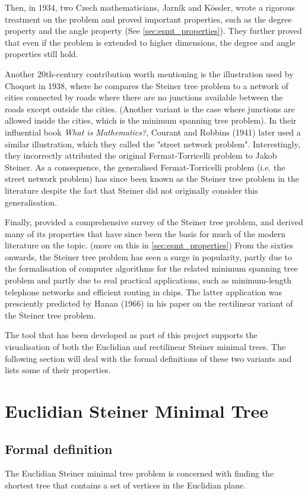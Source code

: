 \documentclass{l4proj}
\begin{document}
Then, in 1934, two Czech mathematicians, Jarník and Kössler, wrote a rigorous treatment on the problem and proved important properties, such as the degree property and the angle property (See \ref{sec:esmt_properties}). They further proved that even if the problem is extended to higher dimensions, the degree and angle properties still hold.

Another 20th-century contribution worth mentioning is the illustration used by Choquet in 1938, where he compares the Steiner tree problem to a network of cities connected by roads where there are no junctions available between the roads except outside the cities. (Another variant is the case where junctions are allowed inside the cities, which is the minimum spanning tree problem). In their influential book \textit{What is Mathematics?}, Courant and Robbins (1941) later used a similar illustration, which they called the "street network problem". Interestingly, they incorrectly attributed the original Fermat-Torricelli problem to Jakob Steiner. As a consequence, the generalised Fermat-Torricelli problem (i.e. the street network problem) has since been known as the Steiner tree problem in the literature despite the fact that Steiner did not originally consider this generalisation.

Finally, \cite{Gilbert1968SteinerMT} provided a comprehensive survey of the Steiner tree problem, and derived many of its properties that have since been the basis for much of the modern literature on the topic. (more on this in \ref{sec:esmt_properties}) From the sixties onwards, the Steiner tree problem has seen a surge in popularity, partly due to the formalisation of computer algorithms for the related minimum spanning tree problem and partly due to real practical applications, such as minimum-length telephone networks and efficient routing in chips. The latter application was presciently predicted by Hanan (1966) in his paper on the rectilinear variant of the Steiner tree problem.

The tool that has been developed as part of this project supports the visualisation of both the Euclidian and rectilinear Steiner minimal trees. The following section will deal with the formal definitions of these two variants and lists some of their properties.
\section{Euclidian Steiner Minimal Tree}

\subsection{Formal definition}
The Euclidian Steiner minimal tree problem is concerned with finding the shortest tree that contains a set of vertices in the Euclidian plane.
\end{document}

